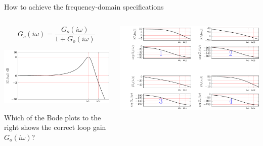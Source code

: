 \documentclass[presentation,aspectratio=169]{beamer}
\begin{document}
\begin{frame}[label={sec:orga188585}]{How to achieve the frequency-domain specifications}
\begin{columns}
\begin{column}{0.28\columnwidth}
\[G_c(i\omega) = \frac{ G_o(i\omega)}{1 + G_o(i\omega)}\]

\includegraphics[width=1.1\linewidth]{../../figures/spec-bode-closed-loop-new}

Which of the Bode plots to the right shows the correct loop gain \(G_o(i\omega)\)?
\end{column}

\begin{column}{0.72\columnwidth}
\begin{center}
\includegraphics[width=1.02\linewidth]{../../figures/spec-bode-open-loop-new}
\end{center}
\end{column}
\end{columns}
\end{frame}
\end{document}
